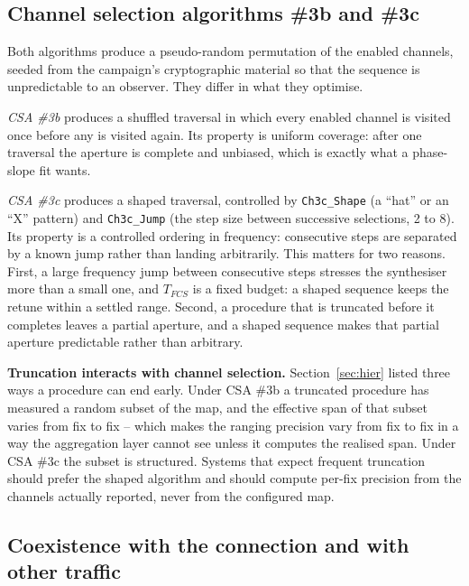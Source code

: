 \documentclass[11pt,a4paper]{article}
\newcommand{\code}[1]{\texttt{\small #1}}
\newcommand{\Tfcs}{T_{FCS}}
\begin{document}
\subsection{Channel selection algorithms \#3b and \#3c}

Both algorithms produce a pseudo-random permutation of the enabled channels, seeded from the
campaign's cryptographic material so that the sequence is unpredictable to an observer. They differ in
what they optimise.

\emph{CSA \#3b} produces a shuffled traversal in which every enabled channel is visited once before
any is visited again. Its property is uniform coverage: after one traversal the aperture is complete
and unbiased, which is exactly what a phase-slope fit wants.

\emph{CSA \#3c} produces a shaped traversal, controlled by \code{Ch3c\_Shape} (a ``hat'' or an ``X''
pattern) and \code{Ch3c\_Jump} (the step size between successive selections, 2 to 8). Its property is
a controlled ordering in frequency: consecutive steps are separated by a known jump rather than
landing arbitrarily. This matters for two reasons. First, a large frequency jump between consecutive
steps stresses the synthesiser more than a small one, and $\Tfcs$ is a fixed budget: a shaped
sequence keeps the retune within a settled range. Second, a procedure that is truncated before it
completes leaves a partial aperture, and a shaped sequence makes that partial aperture predictable
rather than arbitrary.

\begin{callout}
\textbf{Truncation interacts with channel selection.} Section~\ref{sec:hier} listed three ways a
procedure can end early. Under CSA \#3b a truncated procedure has measured a random subset of the
map, and the effective span of that subset varies from fix to fix -- which makes the ranging
precision vary from fix to fix in a way the aggregation layer cannot see unless it computes the
realised span. Under CSA \#3c the subset is structured. Systems that expect frequent truncation
should prefer the shaped algorithm and should compute per-fix precision from the channels actually
reported, never from the configured map.
\end{callout}

\subsection{Coexistence with the connection and with other traffic}
\end{document}
